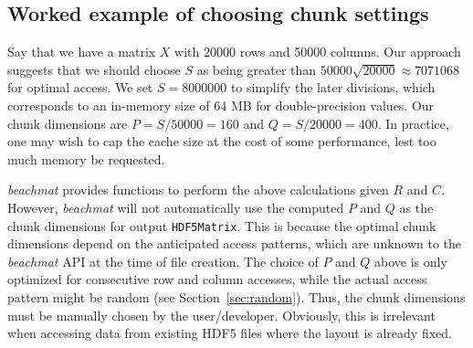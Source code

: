 \documentclass{article}
\begin{document}


%

\subsection{Worked example of choosing chunk settings}
Say that we have a matrix $X$ with 20000 rows and 50000 columns.
Our approach suggests that we should choose $S$ as being greater than $50000\sqrt{20000} \approx 7071068$ for optimal access.
We set $S=8000000$ to simplify the later divisions, which corresponds to an in-memory size of 64 MB for double-precision values.
Our chunk dimensions are $P = S/50000 = 160$ and $Q = S/20000 = 400$.
In practice, one may wish to cap the cache size at the cost of some performance, lest too much memory be requested.

\textit{beachmat} provides functions to perform the above calculations given $R$ and $C$.
However, \textit{beachmat} will not automatically use the computed $P$ and $Q$ as the chunk dimensions for output \texttt{HDF5Matrix}.
This is because the optimal chunk dimensions depend on the anticipated access patterns, which are unknown to the \textit{beachmat} API at the time of file creation.
The choice of $P$ and $Q$ above is only optimized for consecutive row and column accesses, while the actual access pattern might be random (see Section~\ref{sec:random}).
Thus, the chunk dimensions must be manually chosen by the user/developer.
Obviously, this is irrelevant when accessing data from existing HDF5 files where the layout is already fixed.
\end{document}
